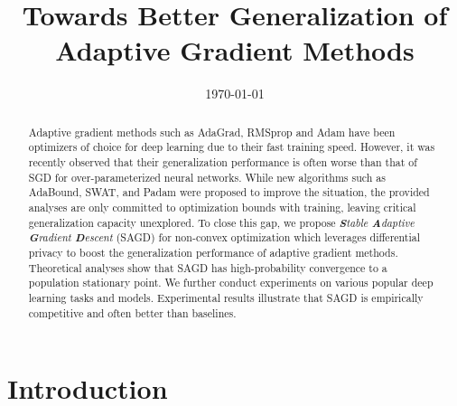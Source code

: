 \documentclass[11pt]{article}
\begin{document}
\title{Towards Better Generalization of Adaptive Gradient Methods}
\date{\today}

\maketitle


\begin{abstract}
Adaptive gradient methods such as AdaGrad, RMSprop and Adam have been optimizers of choice for deep learning due to their fast training speed. However, it was recently observed that their generalization performance is often worse than that of SGD for over-parameterized neural networks. While new algorithms such as AdaBound, SWAT, and Padam were proposed to improve the situation, the provided analyses are only committed to optimization bounds with training, leaving critical generalization capacity unexplored. To close this gap, we propose \textit{\textbf{S}table \textbf{A}daptive \textbf{G}radient \textbf{D}escent} (\textsc{SAGD}) for non-convex optimization which leverages differential privacy to boost the generalization performance of adaptive gradient methods. Theoretical analyses show that \textsc{SAGD} has high-probability convergence to a population stationary point. We further conduct experiments on various popular deep learning tasks and models. Experimental results illustrate that \textsc{SAGD} is empirically competitive and often better than baselines. 
\end{abstract}

\section{Introduction}
\end{document}
